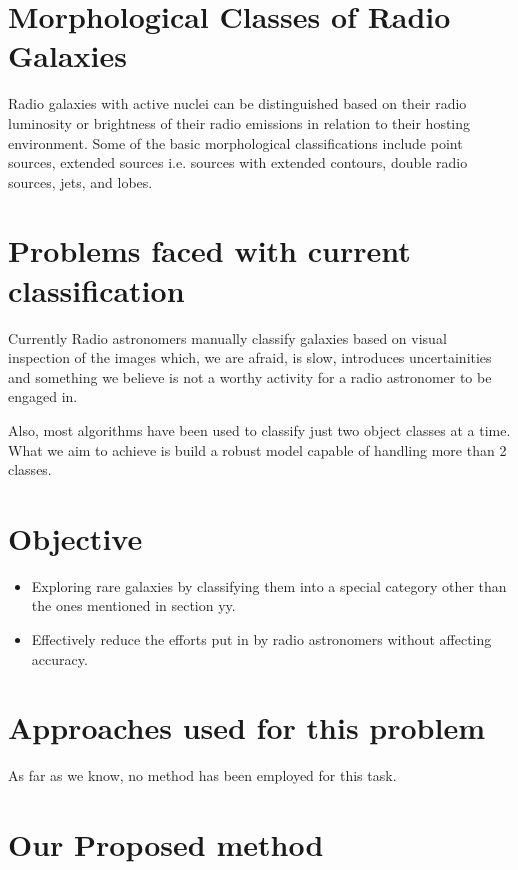 \documentclass{article}
\begin{document}
\begin{multicols*}{2}
\section{Morphological Classes of Radio Galaxies}
\newline Radio galaxies with active nuclei can be distinguished based on their radio luminosity or brightness of their radio emissions in relation to their hosting environment. Some of the basic morphological classifications include point sources, extended sources i.e. sources with extended contours, double radio sources, jets, and lobes.


\section{Problems faced with current classification}


Currently Radio astronomers manually classify galaxies based on visual inspection of the images which, we are afraid, is slow, introduces uncertainities and something we believe is not a worthy activity for a radio astronomer to be engaged in. 

Also, most algorithms have been used to classify just two object classes at a time. What we aim to achieve is build a robust model capable of handling more than 2 classes.




\section{Objective}

\begin{itemize}
	\item Exploring rare galaxies by classifying them into a special category other than the ones mentioned in section yy.
	\item Effectively reduce the efforts put in by radio astronomers without affecting accuracy.
\end{itemize}




\section{Approaches used for this problem}
\newline As far as we know, no method has been employed for this task.


 
\section{Our Proposed method}

\end{multicols*}
\end{document}
